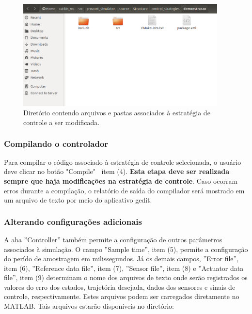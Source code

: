 
\begin{figure}[!ht]
	\centering
	\includegraphics[width=300pt]{figuras/10.png}
	\caption{Diretório contendo arquivos e pastas associados à estratégia de controle a ser modificada.}
	\label{10}
\end{figure}

\subsubsection{Compilando o controlador}

Para compilar o código associado à estratégia de controle selecionada, o usuário deve clicar no botão "Compile" $~$ item (4). \textbf{Esta etapa deve ser realizada sempre que haja modificações na estratégia de controle}. Caso ocorram erros durante a compilação, o relatório de saída do compilador será mostrado em um arquivo de texto por meio do aplicativo gedit.

\subsubsection{Alterando configurações adicionais }

A aba ''Controller'' também permite a configuração de outros parâmetros associados à simulação. O campo ''Sample time'', item (5), permite a configuração do perído de amostragem em milissegundos. Já os demais campos, ''Error file'', item (6), ''Reference data file'', item (7), ''Sensor file'', item (8) e ''Actuator data file'', item (9) determinam o nome dos arquivos de texto onde serão registrados os valores do erro dos estados, trajetória desejada, dados dos sensores e sinais de controle, respectivamente. Estes arquivos podem ser carregados diretamente no MATLAB. Tais arquivos estarão disponíveis no diretório: 


